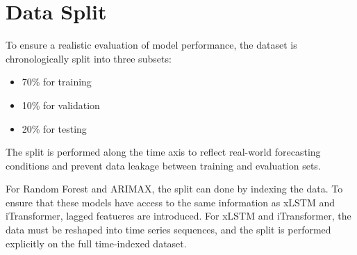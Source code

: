 \documentclass[class=scrbook, crop=false]{standalone}
\begin{document}


\section{Data Split}
\label{Section::Data_Split}
To ensure a realistic evaluation of model performance, the dataset is chronologically split into three subsets:
\begin{itemize}
\item 70\% for training
\item 10\% for validation
\item 20\% for testing
\end{itemize}

The split is performed along the time axis to reflect real-world forecasting conditions and prevent data leakage between training and evaluation sets.

For Random Forest and \gls{ARIMAX}, the split can done by indexing the data. To ensure that these models have access to the same information as xLSTM and iTransformer, lagged featueres are introduced. For xLSTM and iTransformer, the data must be reshaped into time series sequences, and the split is performed explicitly on the full time-indexed dataset.
\end{document}
